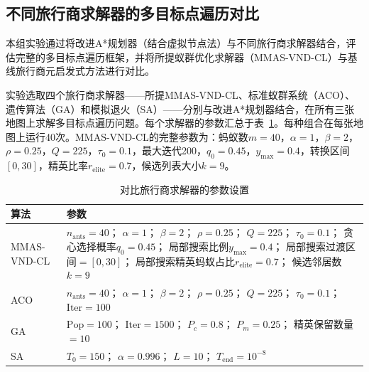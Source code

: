 \documentclass[lettersize,journal]{IEEEtran}
\begin{document}
\subsection{不同旅行商求解器的多目标点遍历对比}

\label{subsec:exp_cmp}

本组实验通过将改进A*规划器（结合虚拟节点法）与不同旅行商求解器结合，评估完整的多目标点遍历框架，并将所提蚁群优化求解器（MMAS-VND-CL）与基线旅行商元启发式方法进行对比。

实验选取四个旅行商求解器——所提MMAS-VND-CL、标准蚁群系统（ACO）、遗传算法（GA）和模拟退火（SA）——分别与改进A*规划器结合，在所有三张地图上求解多目标点遍历问题。每个求解器的参数汇总于表~\ref{tab:tsp_params}。每种组合在每张地图上运行40次。MMAS-VND-CL的完整参数为：蚂蚁数$m=40$，$\alpha=1$，$\beta=2$，$\rho=0.25$，$Q=225$，$\tau_0=0.1$，最大迭代200，$q_0=0.45$，$y_{\max}=0.4$，转换区间$[0,30]$，精英比率$r_{\mathrm{elite}}=0.7$，候选列表大小$k=9$。

\begin{table}[!t]
\caption{对比旅行商求解器的参数设置}
\label{tab:tsp_params}
\centering
\scriptsize
\begin{tabular}{p{}p{}}
\toprule
算法 & 参数 \\
\midrule
MMAS-VND-CL & $n_{\mathrm{ants}}=40$；
$\alpha=1$；
$\beta=2$；\newline
$\rho=0.25$；
$Q=225$；
$\tau_0=0.1$；\newline
贪心选择概率$q_0=0.45$；\newline
局部搜索比例$y_{\max}=0.4$；\newline
局部搜索过渡区间$=[0,30]$；\newline
局部搜索精英蚂蚁占比$r_{\mathrm{elite}}=0.7$；\newline
候选邻居数$k=9$ \\
\addlinespace
ACO & $n_{\mathrm{ants}}=40$；
$\alpha=1$；
$\beta=2$；
$\rho=0.25$；\newline
$Q=225$；
$\tau_0=0.1$；
$\mathrm{Iter}=100$ \\
\addlinespace
GA & $\mathrm{Pop}=100$；
$\mathrm{Iter}=1500$；\newline
$P_c=0.8$；
$P_m=0.25$；\newline
精英保留数量$=10$ \\
\addlinespace
SA & $T_0=150$；
$\alpha=0.996$；\newline
$L=10$；
$T_{\mathrm{end}}=10^{-8}$ \\
\bottomrule
\end{tabular}
\end{table}
\end{document}
